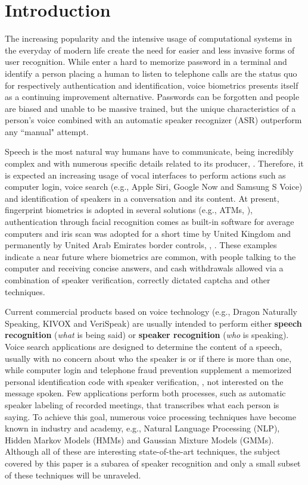 \chapter{Introduction}
\label{ch:intro}

The increasing popularity and the intensive usage of computational systems in the everyday of modern life create the need for easier and less invasive forms of user recognition. While enter a hard to memorize password in a terminal and identify a person placing a human to listen to telephone calls are the status quo for respectively authentication and identification, voice biometrics presents itself as a continuing improvement alternative. Passwords can be forgotten and people are biased and unable to be massive trained, but the unique characteristics of a person's voice combined with an automatic speaker recognizer (ASR) outperform any ``manual" attempt.

Speech is the most natural way humans have to communicate, being incredibly complex and with numerous specific details related to its producer, . Therefore, it is expected an increasing usage of vocal interfaces to perform actions such as computer login, voice search (e.g., Apple Siri, Google Now and Samsung S Voice) and identification of speakers in a conversation and its content. At present, fingerprint biometrics is adopted in several solutions (e.g., ATMs, ), authentication through facial recognition comes as built-in software for average computers and iris scan was adopted for a short time by United Kingdom and permanently by United Arab Emirates border controls, , . These examples indicate a near future where biometrics are common, with people talking to the computer and receiving concise answers, and cash withdrawals allowed via a combination of speaker verification, correctly dictated captcha and other techniques.

Current commercial products based on voice technology (e.g., Dragon Naturally Speaking, KIVOX and VeriSpeak) are usually intended to perform either \textbf{speech recognition} (\emph{what} is being said) or \textbf{speaker recognition} (\emph{who} is speaking). Voice search applications are designed to determine the content of a speech, usually with no concern about who the speaker is or if there is more than one, while computer login and telephone fraud prevention supplement a memorized personal identification code with speaker verification, , not interested on the message spoken. Few applications perform both processes, such as automatic speaker labeling of recorded meetings, that transcribes what each person is saying. To achieve this goal, numerous voice processing techniques have become known in industry and academy, e.g., Natural Language Processing (NLP), Hidden Markov Models (HMMs) and Gaussian Mixture Models (GMMs). Although all of these are interesting state-of-the-art techniques, the subject covered by this paper is a subarea of speaker recognition and only a small subset of these techniques will be unraveled.

